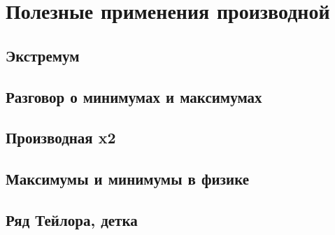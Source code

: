 \section{Полезные применения производной}
\subsection{Экстремум}
\subsection{Разговор о минимумах и максимумах}
\subsection{Производная x2}
\subsection{Максимумы и минимумы в физике}
\subsection{Ряд Тейлора, детка}